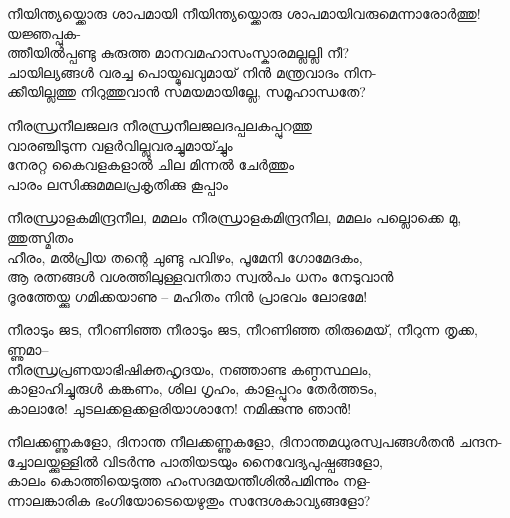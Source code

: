 \begin{enumerate}

\begin{slokam}{\VSv}{\VRV}{നീയിന്ത്യയ്ക്കൊരു ശാപമായി}
നീയിന്ത്യയ്ക്കൊരു ശാപമായിവരുമെന്നാരോർത്തു! യജ്ഞപ്പുക-\\
ത്തീയിൽപ്പണ്ടു കുരുത്ത മാനവമഹാസംസ്കാരമല്ലല്ലി നീ?\\
ചായില്യങ്ങള്‍ വരച്ച പൊയ്മുഖവുമായ്‌ നിൻ മന്ത്രവാദം നിന-\\
ക്കീയില്ലത്തു നിറുത്തുവാൻ സമയമായില്ലേ, സമൂഹാന്ധതേ?
\end{slokam}



\begin{slokam}{\VVt}{\GSK}{നീരന്ധ്രനീലജലദ}
നീരന്ധ്രനീലജലദപ്പലകപ്പുറത്തു\\
വാരഞ്ചിടുന്ന വളർവില്ലുവരച്ചുമായ്ച്ചും\\
നേരറ്റ കൈവളകളാൽ ചില മിന്നൽ ചേർത്തും\\
പാരം ലസിക്കുമമലപ്രകൃതിക്കു കൂപ്പാം
\end{slokam}


\begin{slokam}{\VSv}{\VNM}{നീരന്ധ്രാളകമിന്ദ്രനീല, മമലം}
നീരന്ധ്രാളകമിന്ദ്രനീല, മമലം പല്ലൊക്കെ മു, ത്തുത്സ്മിതം\\
ഹീരം, മൽപ്രിയ തന്റെ ചുണ്ടു പവിഴം, പൂമേനി ഗോമേദകം,\\
ആ രത്നങ്ങള്‍ വശത്തിലുള്ളവനിതാ സ്വൽപം ധനം നേടുവാൻ\\
ദൂരത്തേയ്ക്കു ഗമിക്കയാണു -- മഹിതം നിൻ പ്രാഭവം ലോഭമേ!
\end{slokam}




\begin{slokam}{\VSv}{\VKG}{നീരാടും ജട, നീറണിഞ്ഞ}
നീരാടും ജട, നീറണിഞ്ഞ തിരുമെയ്‌, നീറുന്ന തൃക്ക, ണ്ണുമാ--\\
നീരന്ധ്രപ്രണയാഭിഷിക്തഹൃദയം, നഞ്ഞാണ്ട കണ്ഠസ്ഥലം,\\
കാളാഹിച്ചുരുള്‍ കങ്കണം, ശില ഗൃഹം, കാളപ്പുറം തേർത്തടം,\\
കാലാരേ! ചുടലക്കളക്കളരിയാശാനേ! നമിക്കുന്നു ഞാൻ!
\end{slokam}



\begin{slokam}{\VSv}{\VRV}{നീലക്കണ്ണുകളോ, ദിനാന്ത}
നീലക്കണ്ണുകളോ, ദിനാന്തമധുരസ്വപങ്ങള്‍തൻ ചന്ദന-\\
ച്ചോലയ്ക്കുള്ളിൽ വിടർന്നു പാതിയടയും നൈവേദ്യപുഷ്പങ്ങളോ,\\
കാലം കൊത്തിയെടുത്ത ഹംസദമയന്തീശിൽപമിന്നും നള-\\
ന്നാലങ്കാരിക ഭംഗിയോടെയെഴുതും സന്ദേശകാവ്യങ്ങളോ?
\end{slokam}


\end{enumerate}
